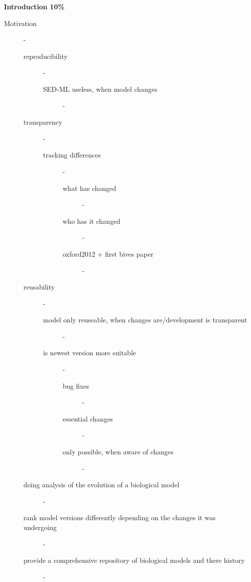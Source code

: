 

\textbf{ Introduction 10\%}
\begin{description}
  \item[Motivation] - 
  \begin{description}
    \item[reproducibility] - 
    \begin{description}
      \item[SED-ML useless, when model changes] - 
    \end{description} %
    \item[transparency] - 
    \begin{description}
      \item[tracking differences] - 
      \begin{description}
        \item[what has changed] - 
        \item[who has it changed] - 
        \item[oxford2012 + first bives paper] - 
      \end{description} %
    \end{description} %
    \item[reusability] - 
    \begin{description}
      \item[model only reuseable, when changes are/development is transparent] - 
      \item[is newest version more suitable] - 
      \begin{description}
        \item[bug fixes] - 
        \item[essential changes] - 
        \item[only possible, when aware of changes] - 
      \end{description} %
    \end{description} %
    \item[doing analysis of the evolution of a biological model] - 
    \item[rank model versions differently depending on the changes it was undergoing] - 
    \item[provide a comprehensive repository of biological models and there history] - 

\end{description}
\end{description}
